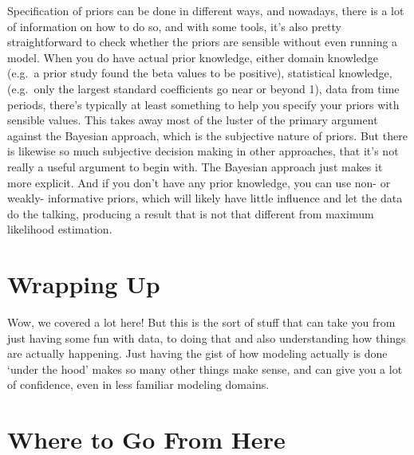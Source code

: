 \documentclass[
  letterpaper,
]{krantz}
\begin{document}
\begin{tcolorbox}[enhanced jigsaw, toprule=.15mm, arc=.35mm, rightrule=.15mm, bottomrule=.15mm, leftrule=.75mm, breakable, colframe=quarto-callout-tip-color-frame, colback=white, left=2mm, opacityback=0]
\begin{minipage}[t]{5.5mm}
\textcolor{quarto-callout-tip-color}{\faLightbulb}
\end{minipage}%
\begin{minipage}[t]{\textwidth - 5.5mm}

Specification of priors can be done in different ways, and nowadays,
there is a lot of information on how to do so, and with some tools, it's
also pretty straightforward to check whether the priors are sensible
without even running a model. When you do have actual prior knowledge,
either domain knowledge (e.g.~a prior study found the beta values to be
positive), statistical knowledge, (e.g.~only the largest standard
coefficients go near or beyond 1), data from time periods, there's
typically at least something to help you specify your priors with
sensible values. This takes away most of the luster of the primary
argument against the Bayesian approach, which is the subjective nature
of priors. But there is likewise so much subjective decision making in
other approaches, that it's not really a useful argument to begin with.
The Bayesian approach just makes it more explicit. And if you don't have
any prior knowledge, you can use non- or weakly- informative priors,
which will likely have little influence and let the data do the talking,
producing a result that is not that different from maximum likelihood
estimation.

\end{minipage}%
\end{tcolorbox}

\section{Wrapping Up}\label{sec-estim-wrap}

Wow, we covered a lot here! But this is the sort of stuff that can take
you from just having some fun with data, to doing that and also
understanding how things are actually happening. Just having the gist of
how modeling actually is done `under the hood' makes so many other
things make sense, and can give you a lot of confidence, even in less
familiar modeling domains.

\section{Where to Go From Here}\label{sec-estim-where-to-go}
\end{document}

